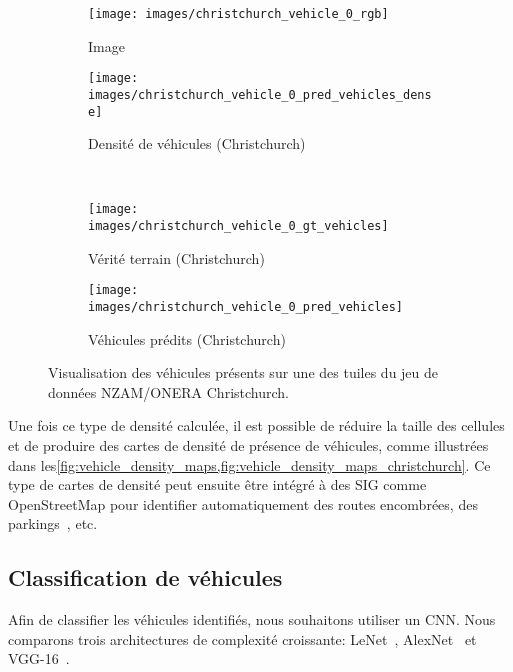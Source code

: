 \begin{figure}[h]
  \centering
  \begin{subfigure}{0.35\textwidth}
    \texttt{[image: images/christchurch\_vehicle\_0\_rgb]}
    \caption{Image }
  \end{subfigure}
  \hspace{0.1\textwidth}
  \begin{subfigure}{0.35\textwidth}
    \texttt{[image: images/christchurch\_vehicle\_0\_pred\_vehicles\_dense]}
    \caption{Densité de véhicules (Christchurch)}
  \end{subfigure}\\
  \begin{subfigure}{0.35\textwidth}
    \texttt{[image: images/christchurch\_vehicle\_0\_gt\_vehicles]}
    \caption{Vérité terrain (Christchurch)}
  \end{subfigure}
  \hspace{0.1\textwidth}
  \begin{subfigure}{0.35\textwidth}
    \texttt{[image: images/christchurch\_vehicle\_0\_pred\_vehicles]}
    \caption{Véhicules prédits (Christchurch)}
  \end{subfigure}
  \caption{Visualisation des véhicules présents sur une des tuiles du jeu de données NZAM/ONERA Christchurch.}
  \label{fig:vehicle_density_maps_christchurch}
\end{figure}

Une fois ce type de densité calculée, il est possible de réduire la taille des cellules et de produire des cartes de densité de présence de véhicules, comme illustrées dans les\cref{fig:vehicle_density_maps,fig:vehicle_density_maps_christchurch}. Ce type de cartes de densité peut ensuite être intégré à des \gls{SIG} comme OpenStreetMap pour identifier automatiquement des routes encombrées, des parkings~\cite{kamenetsky_aerial_2015}, etc.

\subsection{Classification de véhicules}

Afin de classifier les véhicules identifiés, nous souhaitons utiliser un \gls{CNN}. Nous comparons trois architectures de complexité croissante: LeNet~\cite{lecun_gradient-based_1998}, AlexNet~\cite{krizhevsky_imagenet_2012} et VGG-16~\cite{simonyan_very_2014}.

